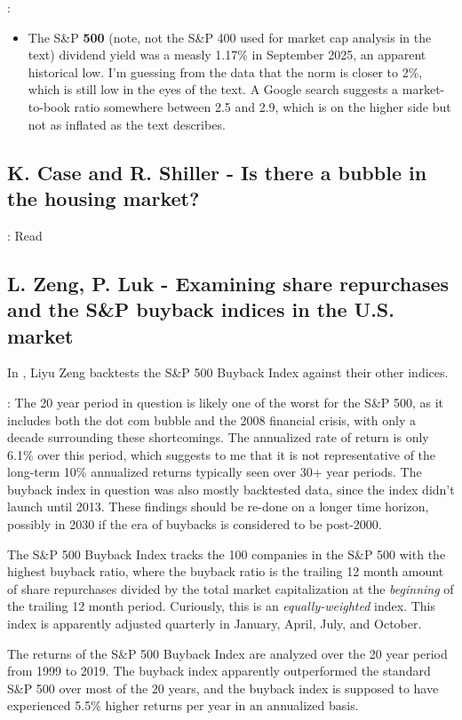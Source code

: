 \note{[Consider]}:
\begin{itemize}
    \item The S\&P {\bf 500} (note, not the S\&P 400 used for market cap analysis in the text) dividend yield was a measly 1.17\% in September 2025, an apparent historical low.  I'm guessing from the data that the norm is closer to 2\%, which is still low in the eyes of the text.  A Google search suggests a market-to-book ratio somewhere between 2.5 and 2.9, which is on the higher side but not as inflated as the text describes.  
\end{itemize}


\subsection{K. Case and R. Shiller - Is there a bubble in the housing market?}

\note{[Todo]}: Read \cite{Case2003}


\subsection{L. Zeng, P. Luk - Examining share repurchases and the S\&P buyback indices in the U.S. market}

In \cite{Zeng2020}, Liyu Zeng backtests the S\&P 500 Buyback Index against their other indices.

\note{[Caution]}: The 20 year period in question is likely one of the worst for the S\&P 500, as it includes both the dot com bubble and the 2008 financial crisis, with only a decade surrounding these shortcomings.  The annualized rate of return is only 6.1\% over this period, which suggests to me that it is not representative of the long-term 10\% annualized returns typically seen over 30+ year periods.  The buyback index in question was also mostly backtested data, since the index didn't launch until 2013.  These findings should be re-done on a longer time horizon, possibly in 2030 if the era of buybacks is considered to be post-2000.

The S\&P 500 Buyback Index tracks the 100 companies in the S\&P 500 with the highest buyback ratio, where the buyback ratio is the trailing 12 month amount of share repurchases divided by the total market capitalization at the {\it beginning} of the trailing 12 month period.  Curiously, this is an {\it equally-weighted} index.  This index is apparently adjusted quarterly in January, April, July, and October.

The returns of the S\&P 500 Buyback Index are analyzed over the 20 year period from 1999 to 2019.  The buyback index apparently outperformed the standard S\&P 500 over most of the 20 years, and the buyback index is supposed to have experienced 5.5\% higher returns per year in an annualized basis.

